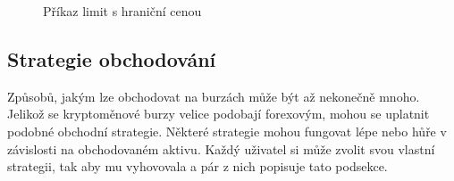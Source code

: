 \begin{figure}[ht]
    \centering
    \qquad

    \qquad
    \caption{Příkaz limit s hraniční cenou}
    \label{fig:limit-orders}
\end{figure}


\subsection{Strategie obchodování}
Způsobů, jakým lze obchodovat na burzách může být až nekonečně mnoho. Jelikož se kryptoměnové burzy velice podobají forexovým, mohou se uplatnit podobné
obchodní strategie. Některé strategie mohou fungovat lépe nebo hůře v závislosti na obchodovaném aktivu.
Každý uživatel si může zvolit svou vlastní strategii, tak aby mu vyhovovala a pár z nich popisuje tato podsekce.

